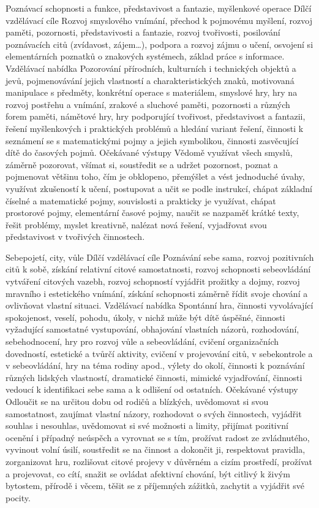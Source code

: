 	Poznávací schopnosti a funkce, představivost a fantazie, myšlenkové operace
	Dílčí vzdělávací cíle
	Rozvoj smyslového vnímání, přechod k pojmovému myšlení, rozvoj paměti, pozornosti, představivosti a fantazie, rozvoj tvořivosti, posilování poznávacích citů (zvídavost, zájem…), podpora a rozvoj zájmu o učení, osvojení si elementárních poznatků o znakových systémech, základ práce s informace.
	Vzdělávací nabídka
	Pozorování přírodních, kulturních i technických objektů a jevů, pojmenovávání jejich vlastností a charakteristických znaků, motivovaná manipulace s předměty, konkrétní operace s materiálem, smyslové hry, hry na rozvoj postřehu a vnímání, zrakové a sluchové paměti, pozornosti a různých forem paměti, námětové hry, hry podporující tvořivost, představivost a fantazii, řešení myšlenkových i praktických problémů a hledání variant řešení, činnosti k seznámení se s matematickými pojmy a jejich symbolikou, činnosti zasvěcující dítě do časových pojmů.
	Očekávané výstupy
	Vědomě využívat všech smyslů, záměrně pozorovat, všímat si, soustředit se a udržet pozornost, poznat a pojmenovat většinu toho, čím je obklopeno, přemýšlet a vést jednoduché úvahy, využívat zkušeností k učení, postupovat a učit se podle instrukcí, chápat základní číselné a matematické pojmy, souvislosti a prakticky je využívat, chápat prostorové pojmy, elementární časové pojmy, naučit se nazpaměť krátké texty, řešit problémy, myslet kreativně, nalézat nová řešení, vyjadřovat svou představivost v tvořivých činnostech.

	Sebepojetí, city, vůle
	Dílčí vzdělávací cíle
	Poznávání sebe sama, rozvoj pozitivních citů k sobě, získání relativní citové samostatnosti, rozvoj schopnosti sebeovládání vytváření citových vazebh, rozvoj schopností vyjádřit prožitky a dojmy, rozvoj mravního i estetického vnímání, získání schopnosti záměrně řídit svoje chování a ovlivňovat vlastní situaci.
	Vzdělávací nabídka
	Spontánní hra, činnosti vyvolávající spokojenost, veselí, pohodu, úkoly, v nichž může být dítě úspěšné, činnosti vyžadující samostatné vystupování, obhajování vlastních názorů, rozhodování, sebehodnocení, hry pro rozvoj vůle a sebeovládání, cvičení organizačních dovedností, estetické a tvůrčí aktivity, cvičení v projevování citů, v sebekontrole a v sebeovládání, hry na téma rodiny apod., výlety do okolí, činnosti k poznávání různých lidských vlastností, dramatické činnosti, mimické vyjadřování, činnosti vedoucí k identifikaci sebe sama a k odlišení od ostatních.
	Očekávané výstupy
	Odloučit se na určitou dobu od rodičů a blízkých, uvědomovat si svou samostatnost, zaujímat vlastní názory, rozhodovat o svých činnostech, vyjádřit souhlas i nesouhlas, uvědomovat si své možnosti a limity, přijímat pozitivní ocenění i případný neúspěch a vyrovnat se s tím, prožívat radost ze zvládnutého, vyvinout volní úsilí, soustředit se na činnost a dokončit ji, respektovat pravidla, zorganizovat hru, rozlišovat citové projevy v důvěrném a cizím prostředí, prožívat a projevovat, co cítí, snažit se ovládat afektivní chování, být citlivý k živým bytostem, přírodě i věcem, těšit se z příjemných zážitků, zachytit a vyjádřit své pocity.

